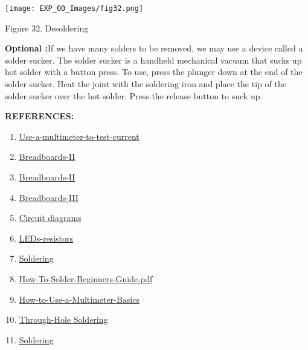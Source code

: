 \documentclass[12pt,a4paper]{article}
\begin{document}
\begin{justify}
\vspace{-8mm}
\begin{center} 
\texttt{[image: EXP\_00\_Images/fig32.png]}
\end{center}
\begin{center} {Figure 32. Desoldering} \end{center}

\noindent \textbf{Optional :}If we have many solders to be removed, we may use a device called a solder sucker. The solder sucker is a handheld mechanical vacuum that sucks up hot solder with a button press. To use, press the plunger down at the end of the solder sucker. Heat the joint with the soldering iron and place the tip of the solder sucker over the hot solder. Press the release button to suck up.

\vspace{4mm}
\noindent \textbf{\large REFERENCES:}
\vspace{-6mm}
\begin{enumerate}
\setlength\itemsep{-0.3em}


\item  \href{https://www.coolcircuit.com/how-to-use-a-multimeter-to-test-current}{Use-a-multimeter-to-test-current}
\item  \href{https://www.circuito.io/blog/breadboards}{Breadboards-II}
\item  \href{https://www.sciencebuddies.org/science-fair-projects/references/how-to-use-a-breadboard}{Breadboards-II}
\item  \href{http://wiring.org.co/learning/tutorials/breadboard}{Breadboards-III} 
\item  \href{http://wiring.org.co/learning/tutorials/diagrams/index.html}{Circuit diagrams}
\item  \href{https:/modelshop.co.uk/static/LEDs-resistors}{LEDs-resistors}
\item  \href{http://www.ece.ualberta.ca/~ee401/resource/manuals/Solder01.pdf}{Soldering}
\item  \href{https://www.makerspaces.com/wp-content/uploads/2017/04/How-To-Solder-Beginners-Guide.pdf}{How-To-Solder-Beginners-Guide.pdf }
\item  \href{https:/www.instructables.com/How-to-Use-a-Multimeter-Basics}{How-to-Use-a-Multimeter-Basics}
\item  \href{https://learn.sparkfun.com/tutorials/how-to-solder-through-hole-soldering/all}{ Through-Hole Soldering }
\item  \href{https://www.uts.edu.au/sites/default/files/Soldering_0.pdf}	{Soldering}



\end{enumerate}
\end{justify}
\end{document}
